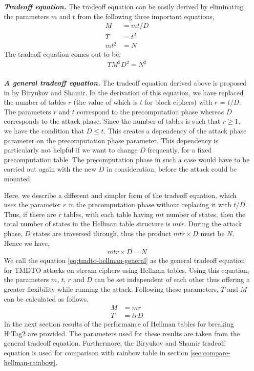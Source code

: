 \noindent \textit{\textbf{Tradeoff equation.}} The tradeoff equation can be easily derived by eliminating the parameters $m$ and $t$ from the following three important equations,
\begin{align*}
M &= mt/D\\
T &= t^2\\
mt^2 &= N
\end{align*}
The tradeoff equation comes out to be,
\begin{align}
\label{eq:tmdto-hellman-stream} TM^2D^2 = N^2
\end{align}
  \\
\noindent \textit{\textbf{A general tradeoff equation.}} The tradeoff equation derived above is proposed in \cite{biryukov2000ctm} by Biryukov and Shamir. In the derivation of this equation, we have replaced the number of tables $r$ (the value of which is $t$ for block ciphers) with $r$ = $t/D$. The parameters $r$ and $t$ correspond to the precomputation phase whereas $D$ corresponds to the attack phase. Since the number of tables is such that $r \geq 1$, we have the condition that $D \leq t$. This creates a dependency of the attack phase parameter on the precomputation phase parameter. This dependency is particularly not helpful if we want to change $D$ frequently, for a fixed precomputation table. The precomputation phase in such a case would have to be carried out again with the new $D$ in consideration, before the attack could be mounted. 

Here, we describe a different and simpler form of the tradeoff equation, which uses the parameter $r$ in the precomputation phase without replacing it with $t/D$. Thus, if there are $r$ tables, with each table having $mt$ number of states, then the total number of states in the Hellman table structure is $mtr$. During the attack phase, $D$ states are traversed through, thus the product $mtr \times D$ must be $N$. Hence we have, 
\begin{align}
\label{eq:tmdto-hellman-general} mtr \times D = N
\end{align}
We call the equation \ref{eq:tmdto-hellman-general} as the general tradeoff equation for TMDTO attacks on stream ciphers using Hellman tables. Using this equation, the parameters $m$, $t$, $r$ and $D$ can be set independent of each other thus offering a greater flexibility while running the attack. Following these parameters, $T$ and $M$ can be calculated as follows.
\begin{align}
\label{eq:tmdto-hellman-general-memory} M &= mr\\
\label {eq:tmdto-hellman-general-time} T &= trD
\end{align}
In the next section results of the performance of Hellman tables for breaking HiTag2 are provided. The parameters used for these results are taken from the general tradeoff equation. Furthermore, the Biryukov and Shamir tradeoff equation is used for comparison with rainbow table in section \ref{sec:compare-hellman-rainbow}.

